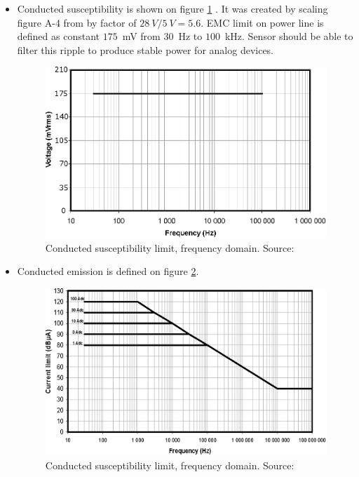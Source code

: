 	\begin{itemize}
		\item Conducted susceptibility is shown on figure \ref{EMC_conducted_susceptibility} . It was created by scaling figure A-4 from \cite{ECSS_E_ST_20_07C} by factor of $28~V/5~V = 5.6$. EMC limit on power line is defined as constant $175$~mV from $30$~Hz to $100$~kHz. Sensor should be able to filter this ripple to produce stable power for analog devices.
		
		\begin{figure}[H]
			\centering
			\includegraphics[width=0.5\paperwidth]{img/EMC_conducted_susceptibility.eps}
			\caption{Conducted susceptibility limit, frequency domain. Source: \cite{ECSS_E_ST_20_07C}}
			\label{EMC_conducted_susceptibility}
		\end{figure}
	
	
		\item Conducted emission is defined on figure \ref{EMC_conducted_emission}.
		
		\begin{figure}[H]
			\centering
			\includegraphics[width=0.5\paperwidth]{img/EMC_conducted_emission.eps}
			\caption{Conducted susceptibility limit, frequency domain. Source: \cite{ECSS_E_ST_20_07C}}
			\label{EMC_conducted_emission}
		\end{figure}	



\end{itemize}

